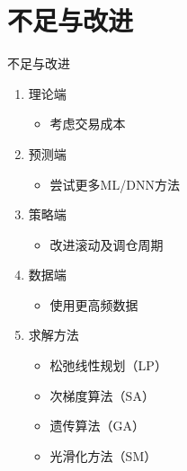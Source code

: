 \documentclass[CJK,aspectratio=43]{beamer}  %
\begin{document}
\section{不足与改进}
\begin{frame}{不足与改进}
	\begin{enumerate}
	\item 理论端
		\begin{itemize}
			\item 考虑交易成本
		\end{itemize}
		
	\item  预测端
		\begin{itemize}
			\item 尝试更多ML/DNN方法
		\end{itemize}
	\item  策略端
		\begin{itemize}
			\item 改进滚动及调仓周期
		\end{itemize}
	\item  数据端
		\begin{itemize}
			\item 使用更高频数据
		\end{itemize}
	\item  求解方法
		\begin{itemize}
			\item 松弛线性规划（LP）
			\item 次梯度算法（SA）
			\item 遗传算法（GA）
			\item 光滑化方法（SM）
		\end{itemize}
	\end{enumerate}
\end{frame}
\end{document}
